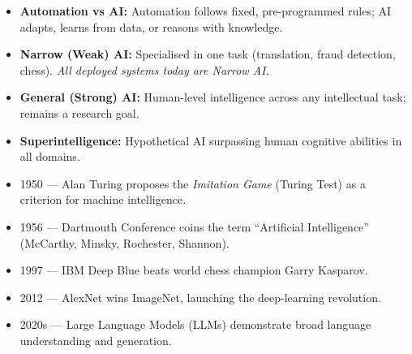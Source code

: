 \documentclass[11pt]{article}
\begin{document}
\begin{aretenir}
\begin{itemize}
\item \textbf{Automation vs AI:} Automation follows fixed, pre-programmed rules; AI adapts, learns from data, or reasons with knowledge.
\item \textbf{Narrow (Weak) AI:} Specialised in one task (translation, fraud detection, chess). \emph{All deployed systems today are Narrow AI.}
\item \textbf{General (Strong) AI:} Human-level intelligence across any intellectual task; remains a research goal.
\item \textbf{Superintelligence:} Hypothetical AI surpassing human cognitive abilities in all domains.
\end{itemize}
\end{aretenir}

\begin{savaistu}
\begin{itemize}
\item 1950 — Alan Turing proposes the \emph{Imitation Game} (Turing Test) as a criterion for machine intelligence.
\item 1956 — Dartmouth Conference coins the term ``Artificial Intelligence'' (McCarthy, Minsky, Rochester, Shannon).
\item 1997 — IBM Deep Blue beats world chess champion Garry Kasparov.
\item 2012 — AlexNet wins ImageNet, launching the deep-learning revolution.
\item 2020s — Large Language Models (LLMs) demonstrate broad language understanding and generation.
\end{itemize}
\end{savaistu}
\end{document}
